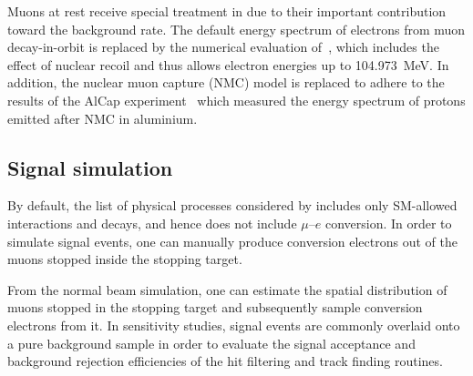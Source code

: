 Muons at rest receive special treatment in \SimG due to their important contribution toward the background rate. The default energy spectrum of electrons from muon decay-in-orbit is replaced by the numerical evaluation of~\cite{czarnecki}, which includes the effect of nuclear recoil and thus allows electron energies up to \SI{104.973}{\MeV}. In addition, the nuclear muon capture (NMC) model is replaced to adhere to the results of the AlCap experiment~\cite{litchfield2015status} which measured the energy spectrum of protons emitted after NMC in aluminium.




\subsection{Signal simulation}
By default, the list of physical processes considered by \SimG includes only SM-allowed interactions and decays, and hence does not include $\mu$--$e$ conversion. In order to simulate signal events, one can manually produce conversion electrons out of the muons stopped inside the stopping target.

From the normal beam simulation, one can estimate the spatial distribution of muons stopped in the stopping target and subsequently sample conversion electrons from it. In sensitivity studies, signal events are commonly overlaid onto a pure background sample in order to evaluate the signal acceptance and background rejection efficiencies of the hit filtering and track finding routines. %


